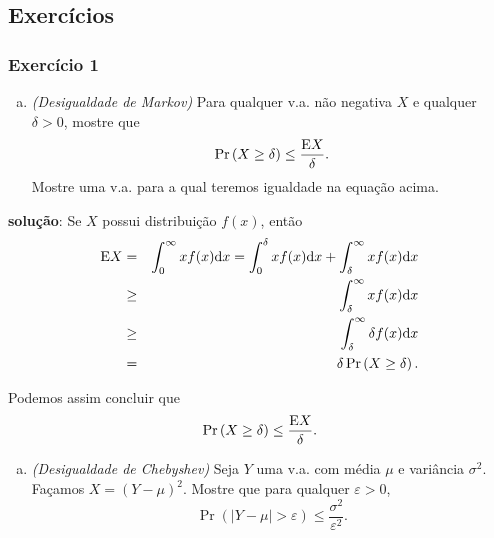 \subsection{Exercícios}
\begin{frame}[allowframebreaks]
  \frametitle{Exercício 1}

  \begin{exercise}
  \begin{enumerate}[a)]
  \item \emph{(Desigualdade de Markov)} Para qualquer v.a. não negativa $X$ e qualquer $\delta > 0$, mostre que
	\begin{equation}
	\Pr \left( X \geq \delta \right) \leq \frac{\mathrm{E} X}{\delta} .
	\end{equation} 
 	Mostre uma v.a. para a qual teremos igualdade na equação acima.
  \end{enumerate}

  \exercisebreak

  \textbf{solução}: 
  Se $X$ possui distribuição $f(x)$, então
  \begin{eqnarray}
  \mathrm{E} X &=& \int_0^\infty x f(x) \mathrm{d}x = \int_0^\delta x f(x) \mathrm{d}x + \int_\delta^\infty x f(x) \mathrm{d}x \nonumber \\
	&\geq& \int_\delta^\infty x f(x) \mathrm{d}x \nonumber \\
	&\geq& \int_\delta^\infty \delta f(x) \mathrm{d}x \nonumber \\
	&=& \delta \Pr \left( X \geq \delta \right) .
  \end{eqnarray}

  \exercisebreak
  Podemos assim concluir que
  \begin{equation}
  \Pr \left( X \geq \delta \right) \leq \frac{\mathrm{E} X}{\delta} .
  \end{equation}


  \exercisebreak
  \begin{enumerate}[b)]
  \item \emph{(Desigualdade de Chebyshev)} 
	Seja $Y$ uma v.a. com média $\mu$ e variância $\sigma^2$. Façamos $X = (Y - \mu)^2$.
	Mostre que para qualquer $\varepsilon > 0$, 
	\begin{equation}
	\Pr \left( \vert Y - \mu \vert > \varepsilon \right) \leq \frac{\sigma^2}{\varepsilon^2} .
	\end{equation}
  \end{enumerate}

  \exercisebreak


\end{exercise}
\end{frame}
